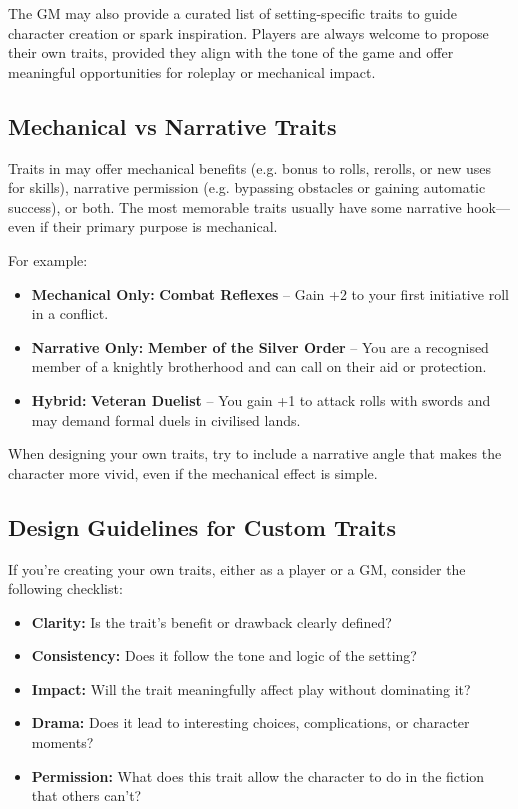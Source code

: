 The GM may also provide a curated list of setting-specific traits to guide character creation or spark inspiration. Players are always welcome to propose their own traits, provided they align with the tone of the game and offer meaningful opportunities for roleplay or mechanical impact.

\subsection{Mechanical vs Narrative Traits}

Traits in \wyrd may offer mechanical benefits (e.g. bonus to rolls, rerolls, or new uses for skills), narrative permission (e.g. bypassing obstacles or gaining automatic success), or both. The most memorable traits usually have some narrative hook—even if their primary purpose is mechanical.

For example:
\begin{itemize}
    \item \textbf{Mechanical Only:} \textbf{Combat Reflexes} – Gain +2 to your first initiative roll in a conflict.
    \item \textbf{Narrative Only:} \textbf{Member of the Silver Order} – You are a recognised member of a knightly brotherhood and can call on their aid or protection.
    \item \textbf{Hybrid:} \textbf{Veteran Duelist} – You gain +1 to attack rolls with swords and may demand formal duels in civilised lands.
\end{itemize}

When designing your own traits, try to include a narrative angle that makes the character more vivid, even if the mechanical effect is simple.

\subsection{Design Guidelines for Custom Traits}

If you’re creating your own traits, either as a player or a GM, consider the following checklist:

\begin{itemize}
    \item \textbf{Clarity:} Is the trait’s benefit or drawback clearly defined?
    \item \textbf{Consistency:} Does it follow the tone and logic of the setting?
    \item \textbf{Impact:} Will the trait meaningfully affect play without dominating it?
    \item \textbf{Drama:} Does it lead to interesting choices, complications, or character moments?
    \item \textbf{Permission:} What does this trait allow the character to do in the fiction that others can’t?
\end{itemize}

